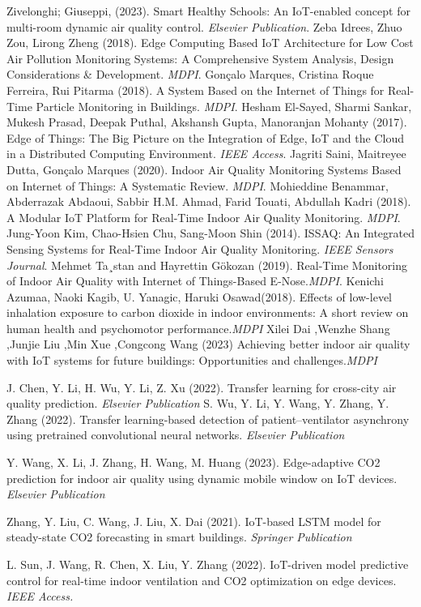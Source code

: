 \documentclass[a4paper,12pt,oneside]{book}
\begin{document}
\begin{thebibliography}{00}
    Zivelonghi; Giuseppi, (2023). Smart Healthy Schools: An IoT-enabled concept for multi-room dynamic air quality control. \textit{Elsevier Publication}. 
        Zeba Idrees, Zhuo Zou, Lirong Zheng (2018). Edge Computing Based IoT Architecture for Low Cost Air Pollution Monitoring Systems: A Comprehensive System Analysis, Design Considerations \& Development. \textit{MDPI}. 
        Gonçalo Marques, Cristina Roque Ferreira, Rui Pitarma (2018). A System Based on the Internet of Things for Real-Time Particle Monitoring in Buildings. \textit{MDPI}. 
    Hesham El-Sayed, Sharmi Sankar, Mukesh Prasad, Deepak Puthal, Akshansh Gupta, Manoranjan Mohanty (2017). Edge of Things: The Big Picture on the Integration of Edge, IoT and the Cloud in a Distributed Computing Environment. \textit{IEEE Access}. 
    Jagriti Saini, Maitreyee Dutta, Gonçalo Marques (2020). Indoor Air Quality Monitoring Systems Based on Internet of Things: A Systematic Review. \textit{MDPI}. 
    Mohieddine Benammar, Abderrazak Abdaoui, Sabbir H.M. Ahmad, Farid Touati, Abdullah Kadri (2018). A Modular IoT Platform for Real-Time Indoor Air Quality Monitoring. \textit{MDPI}. 
    Jung-Yoon Kim, Chao-Hsien Chu, Sang-Moon Shin (2014). ISSAQ: An Integrated Sensing Systems for Real-Time Indoor Air Quality Monitoring. \textit{IEEE Sensors Journal}. 
    Mehmet Ta¸stan and Hayrettin Gökozan (2019). Real-Time Monitoring of Indoor Air Quality with Internet of Things-Based E-Nose.\textit{MDPI}. 
    Kenichi Azumaa, Naoki Kagib, U. Yanagic, Haruki Osawad(2018). Effects of low-level inhalation exposure to carbon dioxide in indoor environments: A short review on human health and psychomotor performance.\textit{MDPI}
    Xilei Dai ,Wenzhe Shang ,Junjie Liu ,Min Xue ,Congcong Wang (2023) Achieving better indoor air quality with IoT systems for future buildings: Opportunities and challenges.\textit{MDPI}

    J. Chen, Y. Li, H. Wu, Y. Li, Z. Xu (2022). Transfer learning for cross-city air quality prediction. \textit{Elsevier Publication}
    S. Wu, Y. Li, Y. Wang, Y. Zhang, Y. Zhang (2022). Transfer learning-based detection of patient–ventilator asynchrony using pretrained convolutional neural networks. \textit{Elsevier Publication}

    Y. Wang, X. Li, J. Zhang, H. Wang, M. Huang (2023). Edge-adaptive CO2 prediction for indoor air quality using dynamic mobile window on IoT devices. \textit{Elsevier Publication}

    Zhang, Y. Liu, C. Wang, J. Liu, X. Dai (2021). IoT-based LSTM model for steady-state CO2 forecasting in smart buildings. \textit{Springer Publication}

    L. Sun, J. Wang, R. Chen, X. Liu, Y. Zhang (2022). IoT-driven model predictive control for real-time indoor ventilation and CO2 optimization on edge devices. \textit{IEEE Access.}
    \end{thebibliography}
    
\end{document}
